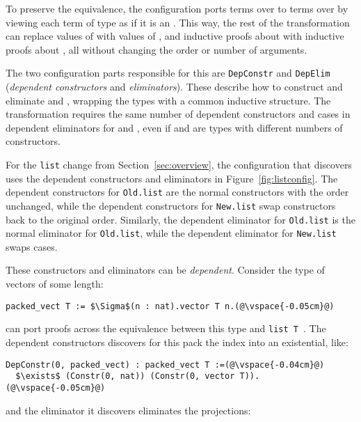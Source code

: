 
To preserve the equivalence, the configuration ports terms over \A to terms over \B by viewing each
term of type \B as if it is an \A.
This way, the rest of the transformation can replace values of \A with values of \B, and
inductive proofs about \A with inductive proofs about \B, %
all without changing the order or number of arguments.

The two configuration parts responsible for this are \lstinline{DepConstr}
and \lstinline{DepElim} (\textit{dependent constructors} and \textit{eliminators}).
These describe how to construct and eliminate \A and \B, wrapping the types with a common inductive structure.
The transformation requires the same number of dependent constructors and cases in dependent eliminators for \A and \B,
even if \A and \B are types with different numbers of constructors.

For the \lstinline{list} change from Section~\ref{sec:overview},
the configuration that \toolname discovers uses the dependent constructors
and eliminators in Figure~\ref{fig:listconfig}. The dependent constructors for \lstinline{Old.list}
are the normal constructors with the order unchanged,
while the dependent constructors for \lstinline{New.list} swap constructors
back to the original order.
Similarly, the dependent eliminator for \lstinline{Old.list} is the normal eliminator for \lstinline{Old.list},
while the dependent eliminator for \lstinline{New.list} swaps cases.

These constructors and eliminators can be \textit{dependent}.
Consider the type of vectors of some length:

\begin{lstlisting}
packed_vect T := $\Sigma$(n : nat).vector T n.(@\vspace{-0.05cm}@)
\end{lstlisting}
\toolname can port proofs across the equivalence between this type and \lstinline{list T}~. %
The dependent constructors \toolname discovers for this pack the index into an existential, like:

\begin{lstlisting}
DepConstr(0, packed_vect) : packed_vect T :=(@\vspace{-0.04cm}@)
  $\exists$ (Constr(0, nat)) (Constr(0, vector T)).(@\vspace{-0.05cm}@)
\end{lstlisting}
and the eliminator it discovers eliminates the projections:

